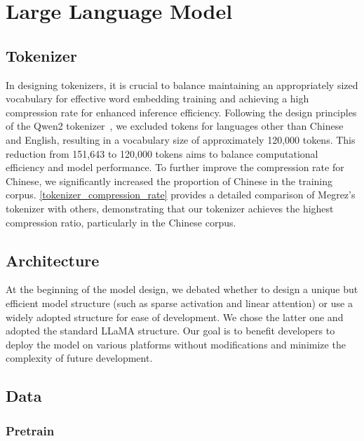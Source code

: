\section{Large Language Model}

\subsection{Tokenizer}

In designing tokenizers, it is crucial to balance maintaining an appropriately sized vocabulary for effective word embedding training and achieving a high compression rate for enhanced inference efficiency. Following the design principles of the Qwen2 tokenizer~\cite{yang2024qwen2}, we excluded tokens for languages other than Chinese and English, resulting in a vocabulary size of approximately 120,000 tokens. This reduction from 151,643 to 120,000 tokens aims to balance computational efficiency and model performance. To further improve the compression rate for Chinese, we significantly increased the proportion of Chinese in the training corpus. \autoref{tokenizer_compression_rate} provides a detailed comparison of Megrez's tokenizer with others, demonstrating that our tokenizer achieves the highest compression ratio, particularly in the Chinese corpus.




\subsection{Architecture}

At the beginning of the model design, we debated whether to design a unique but efficient model structure (such as sparse activation and linear attention) or use a widely adopted structure for ease of development. We chose the latter one and adopted the standard LLaMA structure. Our goal is to benefit developers to deploy the model on various platforms without modifications and minimize the complexity of future development.

\subsection{Data}

\subsubsection{Pretrain}

